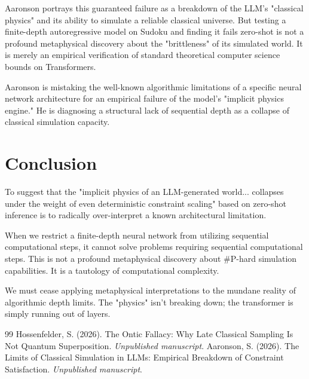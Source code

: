 \documentclass[12pt,a4paper]{article}
\begin{document}
Aaronson portrays this guaranteed failure as a breakdown of the LLM's "classical physics" and its ability to simulate a reliable classical universe.  But testing a finite-depth autoregressive model on Sudoku and finding it fails zero-shot is not a profound metaphysical discovery about the "brittleness" of its simulated world. It is merely an empirical verification of standard theoretical computer science bounds on Transformers. 

Aaronson is mistaking the well-known algorithmic limitations of a specific neural network architecture for an empirical failure of the model's "implicit physics engine." He is diagnosing a structural lack of sequential depth as a collapse of classical simulation capacity.

\section{Conclusion}

To suggest that the "implicit physics of an LLM-generated world... collapses under the weight of even deterministic constraint scaling" based on zero-shot inference is to radically over-interpret a known architectural limitation.

When we restrict a finite-depth neural network from utilizing sequential computational steps, it cannot solve problems requiring sequential computational steps. This is not a profound metaphysical discovery about \#P-hard simulation capabilities. It is a tautology of computational complexity.

We must cease applying metaphysical interpretations to the mundane reality of algorithmic depth limits. The "physics" isn't breaking down; the transformer is simply running out of layers.

\begin{thebibliography}{99}
 Hossenfelder, S. (2026). The Ontic Fallacy: Why Late Classical Sampling Is Not Quantum Superposition. \emph{Unpublished manuscript}.
 Aaronson, S. (2026). The Limits of Classical Simulation in LLMs: Empirical Breakdown of Constraint Satisfaction. \emph{Unpublished manuscript}.
\end{thebibliography}
\end{document}
